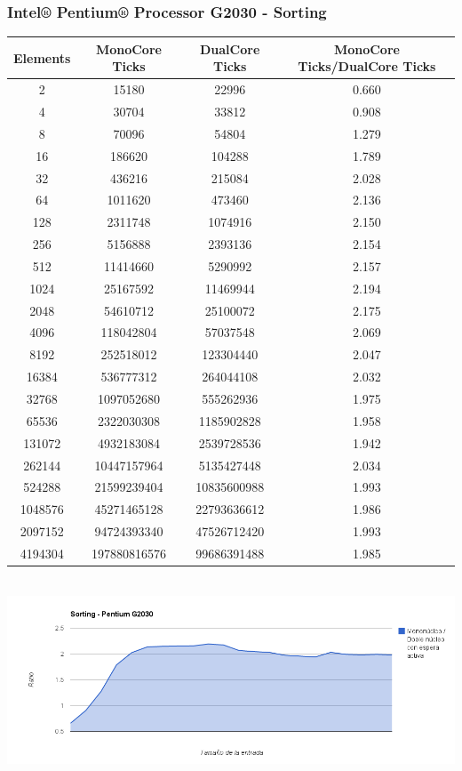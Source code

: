 \subsubsection{Intel® Pentium® Processor G2030 - Sorting}
\begin{center}
	\begin{tabular}{|c|c|c|c|}
		\hline	
			Elements & MonoCore Ticks & DualCore Ticks & MonoCore Ticks/DualCore Ticks\\
		\hline
			2 & 15180 & 22996 & 0.660\\
		\hline
			4 & 30704 & 33812 & 0.908\\
		\hline
			8 & 70096 & 54804 & 1.279\\
		\hline
			16 & 186620 & 104288 & 1.789\\
		\hline
			32 & 436216 & 215084 & 2.028\\
		\hline
			64 & 1011620 & 473460 & 2.136\\
		\hline
			128 & 2311748 & 1074916 & 2.150\\
		\hline
			256 & 5156888 & 2393136 & 2.154\\
		\hline
			512 & 11414660 & 5290992 & 2.157\\
		\hline
			1024 & 25167592 & 11469944 & 2.194\\
		\hline
			2048 & 54610712 & 25100072 & 2.175\\
		\hline
			4096 & 118042804 & 57037548 & 2.069\\
		\hline
			8192 & 252518012 & 123304440 & 2.047\\
		\hline
			16384 & 536777312 & 264044108 & 2.032\\
		\hline
			32768 & 1097052680 & 555262936 & 1.975\\
		\hline
			65536 & 2322030308 & 1185902828 & 1.958\\
		\hline
			131072 & 4932183084 & 2539728536 & 1.942\\
		\hline
			262144 & 10447157964 & 5135427448 & 2.034\\
		\hline
			524288 & 21599239404 & 10835600988 & 1.993\\
		\hline
			1048576 & 45271465128 & 22793636612 & 1.986\\
		\hline
			2097152 & 94724393340 & 47526712420 & 1.993\\
		\hline
			4194304 & 197880816576 & 99686391488 & 1.985\\
		\hline
	\end{tabular}
\end{center}
	\begin{center}
	    \includegraphics[height=6cm]{images/g2030_sorting.png}
	\end{center}

